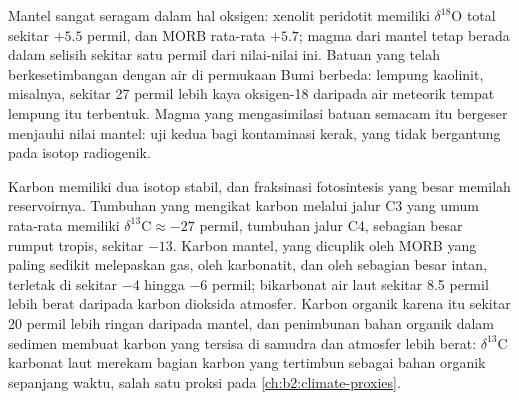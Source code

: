 Mantel sangat seragam dalam hal oksigen: xenolit peridotit memiliki
$\delta^{18}\mathrm{O}$ total sekitar $+5.5$ permil, dan MORB rata-rata $+5.7$; magma
dari mantel tetap berada dalam selisih sekitar satu permil dari nilai-nilai ini. Batuan yang
telah berkesetimbangan dengan air di permukaan Bumi berbeda: lempung kaolinit, misalnya,
sekitar 27 permil lebih kaya oksigen-18 daripada air meteorik tempat lempung itu
terbentuk. Magma yang mengasimilasi batuan semacam itu bergeser menjauhi nilai
mantel: uji kedua bagi kontaminasi kerak, yang tidak bergantung pada isotop
radiogenik.

Karbon memiliki dua isotop stabil, dan fraksinasi fotosintesis yang besar
memilah reservoirnya. Tumbuhan yang mengikat karbon melalui jalur C3 yang umum rata-rata memiliki
$\delta^{13}\mathrm{C} \approx -27$ permil, tumbuhan jalur C4, sebagian besar rumput
tropis, sekitar $-13$. Karbon mantel, yang dicuplik oleh MORB yang paling sedikit melepaskan gas,
oleh karbonatit, dan oleh sebagian besar intan, terletak di sekitar $-4$ hingga $-6$ permil;
bikarbonat air laut sekitar 8.5 permil lebih berat daripada karbon dioksida
atmosfer. Karbon organik karena itu sekitar 20 permil lebih ringan daripada mantel, dan
penimbunan bahan organik dalam sedimen membuat karbon yang tersisa di
samudra dan atmosfer lebih berat: $\delta^{13}\mathrm{C}$ karbonat laut
merekam bagian karbon yang tertimbun sebagai bahan organik sepanjang waktu, salah satu
proksi pada \cref{ch:b2:climate-proxies}.

\begin{omfigure}
\centering
{}
\par{}
\end{omfigure}

